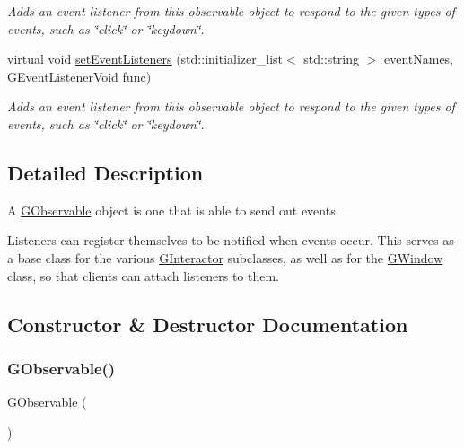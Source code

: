 \begin{DoxyCompactItemize}
\begin{DoxyCompactList}\small\item\em Adds an event listener from this observable object to respond to the given types of events, such as \char`\"{}click\char`\"{} or \char`\"{}keydown\char`\"{}. \end{DoxyCompactList}\item 
virtual void \mbox{\hyperlink{classsgl_1_1GObservable_a7867184bbb686f74fae8a4db927da799}{set\+Event\+Listeners}} (std\+::initializer\+\_\+list$<$ std\+::string $>$ event\+Names, \mbox{\hyperlink{namespacesgl_a54427ce97bb1c2804e4fe2b0a62e8b17}{G\+Event\+Listener\+Void}} func)
\begin{DoxyCompactList}\small\item\em Adds an event listener from this observable object to respond to the given types of events, such as \char`\"{}click\char`\"{} or \char`\"{}keydown\char`\"{}. \end{DoxyCompactList}\end{DoxyCompactItemize}


\subsection{Detailed Description}
A \mbox{\hyperlink{classsgl_1_1GObservable}{G\+Observable}} object is one that is able to send out events. 

Listeners can register themselves to be notified when events occur. This serves as a base class for the various \mbox{\hyperlink{classsgl_1_1GInteractor}{G\+Interactor}} subclasses, as well as for the \mbox{\hyperlink{classsgl_1_1GWindow}{G\+Window}} class, so that clients can attach listeners to them. 

\subsection{Constructor \& Destructor Documentation}
\mbox{\label{classsgl_1_1GObservable_aa083d318cdd2a045471445fbbd26b919}} 
\subsubsection{\texorpdfstring{G\+Observable()}{GObservable()}}
{\footnotesize\ttfamily \mbox{\hyperlink{classsgl_1_1GObservable}{G\+Observable}} (\begin{DoxyParamCaption}{ }\end{DoxyParamCaption})}



